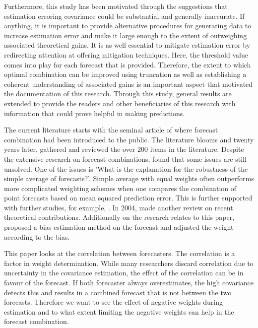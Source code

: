 \documentclass[11pt]{article}
\begin{document}
Furthermore, this study has been motivated through the suggestions that estimation erroring covariance could be substantial and generally inaccurate. If anything, it is important to provide alternative procedures for generating data to increase estimation error and make it large enough to the extent of outweighing associated theoretical gains. It is as well essential to mitigate estimation error by redirecting attention at offering mitigation techniques. Here, the threshold value comes into play for each forecast that is provided. Therefore, the extent to which optimal combination can be improved using truncation as well as establishing a coherent understanding of associated gains is an important aspect that motivated the documentation of this research. Through this study, general results are extended to provide the readers and other beneficiaries of this research with information that could prove helpful in making predictions.

The current literature starts with the seminal article of \cite{Bates1969} where forecast combination had been introduced to the public. The literature blooms and twenty years later, \cite{Clemen1989} gathered and reviewed the over 200 items in the literature. Despite the extensive research on forecast combinations, \citeauthor{Clemen1989} found that some issues are still unsolved. One of the issues is 'What is the explanation for the robustness of the simple average of forecasts?'. Simple average with equal weights often outperforms more complicated weighting schemes when one compares the combination of point forecasts based on mean squared prediction error. This is further supported with further studies, for example, \citep{Stock2004}. In 2004, \citeauthor{Elliot2004} made another review on recent theoretical contributions. Additionally on the research relates to this paper, \cite{Gibbs2017} proposed a bias estimation method on the forecast and adjusted the weight according to the bias.

This paper looks at the correlation between forecasters. The correlation is a factor in weight determination. While many researchers discard correlation due to uncertainty in the covariance estimation, the effect of the correlation can be in favour of the forecast. If both forecaster always overestimates, the high covariance detects this and results in a combined forecast that is not between the two forecasts. Therefore we want to see the effect of negative weights during estimation and to what extent limiting the negative weights can help in the forecast combination.
\end{document}
